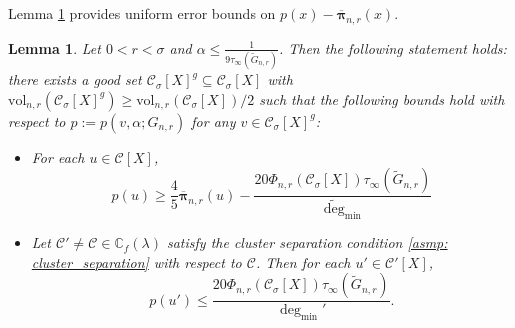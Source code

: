 \documentclass[11pt,twoside]{article}
\newtheorem{lemma}{Lemma}
\newcommand{\vol}{\mathrm{vol}}
\newcommand{\1}{\mathbf{1}}
\newcommand{\pbf}{p}        %
\newcommand{\pibf}{\bm{\pi}}
\newcommand{\Xbf}{X}             %
\newcommand{\Cbb}{\mathbb{C}}
\newcommand{\Cset}{\mathcal{C}}
\newcommand{\Csig}{\Cset_{\sigma}}
\newcommand{\degminpr}{\deg_{\min}'}
\newcommand{\degminwt}{\widetilde{\deg}_{\min}}
\begin{document}
Lemma \ref{lem: setup} provides uniform error bounds on $\pbf(x) - \overline{\pibf}_{n,r}(x)$. 

\begin{lemma} 
	\label{lem: setup}
	Let $0 < r < \sigma$ and $\alpha \leq \frac{1}{9 \tau_{\infty}(\widetilde{G}_{n,r})}$. Then the following statement holds: there exists a good set $\Csig[\Xbf]^g \subseteq \Csig[\Xbf]$ with $\vol_{n,r}(\Csig[\Xbf]^g) \geq \vol_{n,r}(\Csig[\Xbf])/2$ such that the following bounds hold with respect to $\pbf := \pbf(v,\alpha;G_{n,r})$ for any $v \in \Csig[\Xbf]^g$:
	\begin{itemize}
		\item For each $u \in \Cset[\Xbf]$,
		\begin{equation}
		\label{eqn: lower_bound_PPR_in_cluster}
		\pbf(u) \geq \frac{4}{5} \overline{\pibf}_{n,r}(u) - \frac{20 \Phi_{n,r}(\Csig[\Xbf]) \tau_{\infty}(\widetilde{G}_{n,r})}{\degminwt}
		\end{equation}
		\item Let $\Cset' \neq \Cset \in \Cbb_f(\lambda)$ satisfy the cluster separation condition \ref{asmp: cluster_separation} with respect to $\Cset$. Then for each $u' \in \Cset'[\Xbf]$,
		\begin{equation}
		\label{eqn: upper_bound_PPR_in_other_cluster}
		\pbf(u') \leq \frac{20 \Phi_{n,r}(\Csig[\Xbf]) \tau_{\infty}(\widetilde{G}_{n,r})}{\degminpr}.
		\end{equation}
	\end{itemize}
\end{lemma}
\end{document}
